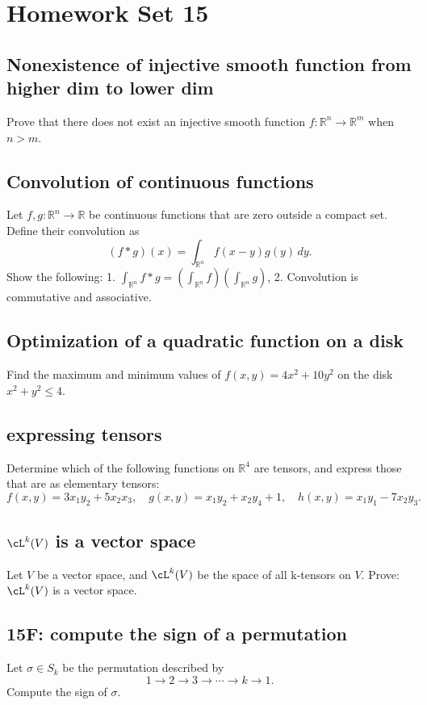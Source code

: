 \documentclass[lang=cn,11pt]{template}
\begin{document}
\chapter{Homework Set 15}

\section{Nonexistence of injective smooth function from higher dim to lower dim}
Prove that there does not exist an injective smooth function \( f : \mathbb{R}^n \to \mathbb{R}^m \) when \( n > m \).

\section{Convolution of continuous functions}
Let \( f, g : \mathbb{R}^n \to \mathbb{R} \) be continuous functions that are zero outside a compact set. Define their convolution as
\[
(f \ast g)(x) = \int_{\mathbb{R}^n} f(x-y)g(y) \, dy.
\]
Show the following:
1. \(\int_{\mathbb{R}^n} f \ast g = \left( \int_{\mathbb{R}^n} f \right) \left( \int_{\mathbb{R}^n} g \right)\),
2. Convolution is commutative and associative.

\section{Optimization of a quadratic function on a disk}
Find the maximum and minimum values of \( f(x, y) = 4x^2 + 10y^2 \) on the disk \( x^2 + y^2 \leq 4 \).

\section{expressing tensors}
Determine which of the following functions on \( \mathbb{R}^4 \) are tensors, and express those that are as elementary tensors:
\[
f(x, y) = 3x_1y_2 + 5x_2x_3, \quad g(x, y) = x_1y_2 + x_2y_4 + 1, \quad h(x, y) = x_1y_1 - 7x_2y_3.
\]

\section{$\cL^k(V)$ is a vector space}
Let $V$ be a vector space, and $\cL^k(V)$ be the space of all k-tensors on $V$. Prove: $\cL^k(V)$ is a vector space.

\section*{15F: compute the sign of a permutation}
Let \( \sigma \in S_k \) be the permutation described by
\[
1 \to 2 \to 3 \to \cdots \to k \to 1.
\]
Compute the sign of \( \sigma \).
\end{document}
